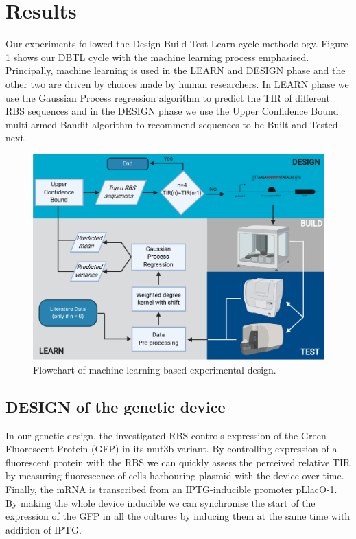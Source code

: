 \documentclass{article}
\begin{document}
\section{Results}


Our experiments followed the Design-Build-Test-Learn cycle methodology.
Figure \ref{fig: Flowchart} shows our DBTL cycle with the machine learning process emphasised.
Principally, machine learning is used in the LEARN and DESIGN phase and the other two are driven by choices made by human researchers. 
In LEARN phase we use the Gaussian Process regression algorithm to predict the TIR of different RBS sequences and in the DESIGN phase we use the Upper Confidence Bound multi-armed Bandit algorithm to recommend sequences to be Built and Tested next.\\

\begin{figure}[h]
    \centering
    \includegraphics[scale=0.7]{plots/flowchart.pdf}
    \caption{Flowchart of machine learning based experimental design.}
    \label{fig: Flowchart}
\end{figure}



\subsection{DESIGN of the genetic device}
In our genetic design, the investigated RBS controls expression of the Green Fluorescent Protein (GFP) in its mut3b variant. 
By controlling expression of a fluorescent protein with the RBS we can quickly assess the perceived relative TIR by measuring fluorescence of cells harbouring plasmid with the device over time.
Finally, the mRNA is transcribed from an IPTG-inducible promoter pLlacO-1. 
By making the whole device inducible we can synchronise the start of the expression of the GFP in all the cultures by inducing them at the same time with addition of IPTG.\\
\end{document}
